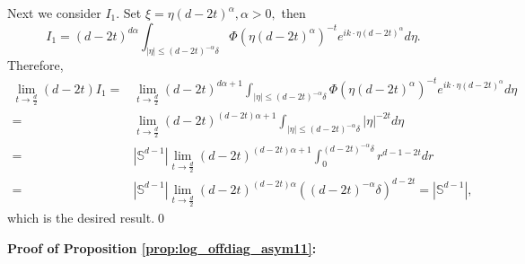 \documentclass[reqno,12pt]{amsart}
\numberwithin{equation}{section}
\begin{document}
	  Next we consider $I_1.$ Set $\xi=\eta\left(d-2t\right)^{\alpha},\alpha>0,$ then
	 \[I_1=\left(d-2t\right)^{d\alpha}\int_{|\eta|\le \left(d-2t\right)^{-\alpha}\delta}\Phi(\eta\left(d-2t\right)^{\alpha})^{-t}e^{ik\cdot \eta\left(d-2t\right)^{\alpha}}d\eta.\]
	 Therefore, 
	 \[\begin{aligned}
	 	\lim\limits_{t\rightarrow \frac{d}{2}}\left(d-2t\right)I_1=&	\lim\limits_{t\rightarrow \frac{d}{2}}\left(d-2t\right)^{d\alpha+1}\int_{|\eta|\le \left(d-2t\right)^{-\alpha}\delta}\Phi(\eta\left(d-2t\right)^{\alpha})^{-t}e^{ik\cdot \eta\left(d-2t\right)^{\alpha}}d\eta\\=&	\lim\limits_{t\rightarrow \frac{d}{2}}\left(d-2t\right)^{(d-2t)\alpha+1}\int_{|\eta|\le \left(d-2t\right)^{-\alpha}\delta}|\eta|^{-2t}d\eta\\=&|\mathbb{S}^{d-1}|\lim\limits_{t\rightarrow \frac{d}{2}}\left(d-2t\right)^{(d-2t)\alpha+1}\int_{0}^ {\left(d-2t\right)^{-\alpha}\delta}r^{d-1-2t}dr\\=&|\mathbb{S}^{d-1}|\lim\limits_{t\rightarrow \frac{d}{2}}\left(d-2t\right)^{(d-2t)\alpha}\left(\left(d-2t\right)^{-\alpha}\delta\right)^{d-2t}=|\mathbb{S}^{d-1}|,
	 \end{aligned}\]
	 which is the desired result.\qed



\vspace{1\baselineskip} 

\noindent \textbf{Proof of Proposition \ref{prop:log_offdiag_asym11}:}
\end{document}

